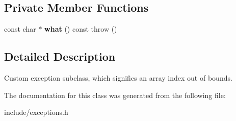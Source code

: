 \subsection*{Private Member Functions}
\begin{DoxyCompactItemize}
\item 
\mbox{\label{classIndexOutOfBoundsError_a9077c8657e9bd2bd2d42d3d74b9770b6}} 
const char $\ast$ {\bfseries what} () const  throw ()
\end{DoxyCompactItemize}


\subsection{Detailed Description}
Custom exception subclass, which signifies an array index out of bounds. 

The documentation for this class was generated from the following file\+:\begin{DoxyCompactItemize}
\item 
include/exceptions.\+h\end{DoxyCompactItemize}
